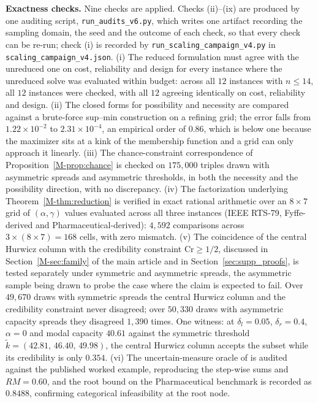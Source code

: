 \documentclass[11pt]{article}
\begin{document}
\textbf{Exactness checks.} Nine checks are applied. Checks (ii)--(ix) are produced by one auditing
script, \texttt{run\_audits\_v6.py}, which writes one artifact recording the sampling domain, the seed
and the outcome of each check, so that every check can be re-run; check (i) is recorded by
\texttt{run\_scaling\_campaign\_v4.py} in \texttt{scaling\_campaign\_v4.json}. (i) The reduced formulation must agree with the unreduced one on cost, reliability and
design for every instance where the unreduced solve was evaluated within budget: across all $12$
instances with $n \le 14$, all $12$ instances were checked, with all $12$ agreeing identically on cost, reliability and design. (ii) The closed forms for possibility and necessity are compared against a brute-force
sup--min construction on a refining grid; the error falls from $1.22\times10^{-2}$ to
$2.31\times10^{-4}$, an empirical order of $0.86$, which is below one because the maximizer sits at a
kink of the membership function and a grid can only approach it linearly. (iii) The chance-constraint
correspondence of Proposition~\ref*{M-prop:chance} is checked on $175{,}000$ triples drawn with asymmetric spreads and
asymmetric thresholds, in both the necessity and the possibility direction, with no discrepancy.
(iv) The factorization underlying Theorem~\ref*{M-thm:reduction} is verified in exact rational arithmetic over an
$8 \times 7$ grid of $(\alpha,\gamma)$ values evaluated across all three instances (IEEE RTS-79, Fyffe-derived and Pharmaceutical-derived):
$4{,}592$ comparisons across $3 \times (8 \times 7) = 168$ cells, with zero mismatch.
(v) The coincidence of the central Hurwicz column with the credibility constraint $\mathrm{Cr}\ge 1/2$, discussed in Section~\ref*{M-sec:family} of the main article and in Section~\ref{sec:supp_proofs}, is tested separately
under symmetric and asymmetric spreads, the asymmetric sample being drawn to probe the case where the
claim is expected to fail. Over $49{,}670$ draws with symmetric spreads the central Hurwicz column and the
credibility constraint never disagreed; over $50{,}330$ draws with asymmetric capacity spreads they
disagreed $1{,}390$ times. One witness: at $\delta_l = 0.05$, $\delta_r = 0.4$, $\alpha = 0$ and modal
capacity $40.61$ against the symmetric threshold $\tilde{k} = (42.81,\,46.40,\,49.98)$, the central
Hurwicz column accepts the subset while its credibility is only $0.354$.
(vi) The uncertain-measure oracle of \citet{WeiShiZhang2025a} is audited against the published worked example, reproducing the step-wise sums and $RM=0.60$, and the root bound on the Pharmaceutical benchmark is recorded as $0.8488$, confirming categorical infeasibility at the root node.
\end{document}
